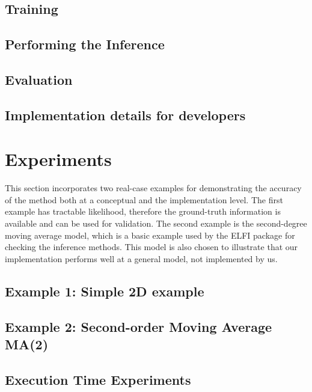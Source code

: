 \documentclass[11pt,twoside]{article}
\numberwithin{Theorem}{section}
\numberwithin{Definition}{section}
\numberwithin{Lemma}{section}
\numberwithin{Algorithm}{section}
\numberwithin{equation}{section}
\begin{document}
\subsection{Training}
\label{subsec:training}


\subsection{Performing the Inference}
\label{subsec:inference}


\subsection{Evaluation}
\label{subsec:evaluation}


\subsection{Implementation details for developers}
\label{subsec:developers}

\clearpage


\section{Experiments}
This section incorporates two real-case examples for demonstrating the
accuracy of the method both at a conceptual and the implementation
level. The first example has tractable likelihood, therefore the
ground-truth information is available and can be used for
validation. The second example is the second-degree moving average
model, which is a basic example used by the ELFI package for checking
the inference methods. This model is also chosen to illustrate that
our implementation performs well at a general model, not implemented
by us.

\subsection{Example 1: Simple 2D example}
\label{subsec:ex1}


\subsection{Example 2: Second-order Moving Average MA(2)}
\label{subsec:ma2}


\subsection{Execution Time Experiments}
\label{subsec:exec}

\clearpage
\end{document}
